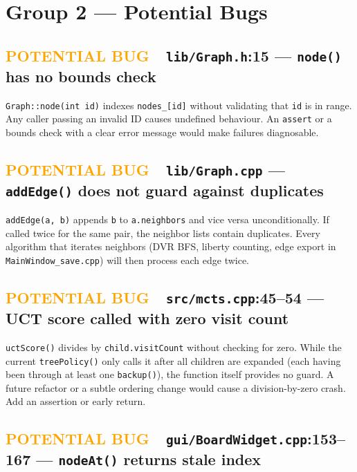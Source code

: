 \documentclass[11pt,letterpaper]{article}
\newcommand{\file}[1]{\texttt{#1}}
\newcommand{\code}[1]{\texttt{#1}}
\newcommand{\pbug}{\textcolor{orange}{\textbf{POTENTIAL BUG}}}
\begin{document}
\section{Group 2 — Potential Bugs}

\subsection{\pbug\ \ \file{lib/Graph.h}:15 — \code{node()} has no bounds check}

\code{Graph::node(int id)} indexes \code{nodes\_[id]} without validating
that \code{id} is in range.  Any caller passing an invalid ID causes
undefined behaviour.  An \code{assert} or a bounds check with a clear error
message would make failures diagnosable.

\subsection{\pbug\ \ \file{lib/Graph.cpp} — \code{addEdge()} does not guard against duplicates}

\code{addEdge(a, b)} appends \code{b} to \code{a.neighbors} and vice versa
unconditionally.  If called twice for the same pair, the neighbor lists
contain duplicates.  Every algorithm that iterates neighbors (DVR BFS, liberty
counting, edge export in \file{MainWindow\_save.cpp}) will then process each
edge twice.

\subsection{\pbug\ \ \file{src/mcts.cpp}:45--54 — UCT score called with zero visit count}

\code{uctScore()} divides by \code{child.visitCount} without checking for
zero.  While the current \code{treePolicy()} only calls it after all children
are expanded (each having been through at least one \code{backup()}), the
function itself provides no guard.  A future refactor or a subtle ordering
change would cause a division-by-zero crash.  Add an assertion or early
return.

\subsection{\pbug\ \ \file{gui/BoardWidget.cpp}:153--167 — \code{nodeAt()} returns stale index}
\end{document}
